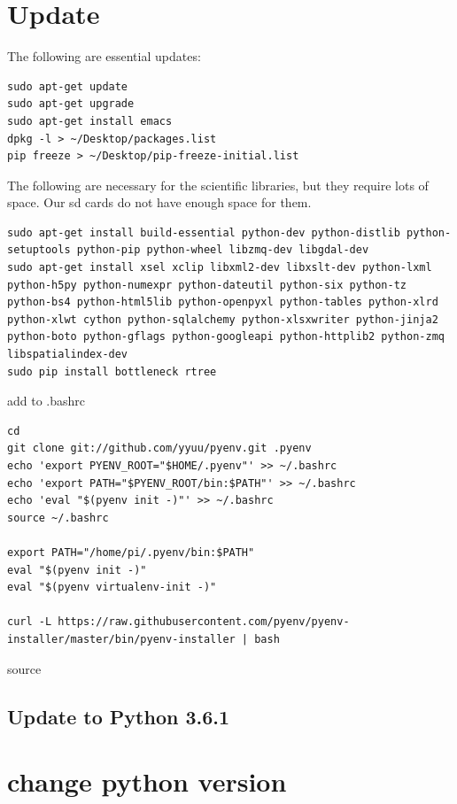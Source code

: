 \section{Update}\label{update}

The following are essential updates:

\begin{verbatim}
sudo apt-get update
sudo apt-get upgrade
sudo apt-get install emacs
dpkg -l > ~/Desktop/packages.list
pip freeze > ~/Desktop/pip-freeze-initial.list
\end{verbatim}

The following are necessary for the scientific libraries, but they
require lots of space. Our sd cards do not have enough space for them.

\begin{verbatim}
sudo apt-get install build-essential python-dev python-distlib python-setuptools python-pip python-wheel libzmq-dev libgdal-dev
sudo apt-get install xsel xclip libxml2-dev libxslt-dev python-lxml python-h5py python-numexpr python-dateutil python-six python-tz python-bs4 python-html5lib python-openpyxl python-tables python-xlrd python-xlwt cython python-sqlalchemy python-xlsxwriter python-jinja2 python-boto python-gflags python-googleapi python-httplib2 python-zmq libspatialindex-dev
sudo pip install bottleneck rtree
\end{verbatim}

add to .bashrc

\begin{verbatim}
cd
git clone git://github.com/yyuu/pyenv.git .pyenv
echo 'export PYENV_ROOT="$HOME/.pyenv"' >> ~/.bashrc
echo 'export PATH="$PYENV_ROOT/bin:$PATH"' >> ~/.bashrc
echo 'eval "$(pyenv init -)"' >> ~/.bashrc
source ~/.bashrc

export PATH="/home/pi/.pyenv/bin:$PATH"
eval "$(pyenv init -)"
eval "$(pyenv virtualenv-init -)"

curl -L https://raw.githubusercontent.com/pyenv/pyenv-installer/master/bin/pyenv-installer | bash
\end{verbatim}

source

\subsection{Update to Python 3.6.1}\label{update-to-python-3.6.1}

\section{change python version}\label{change-python-version}

